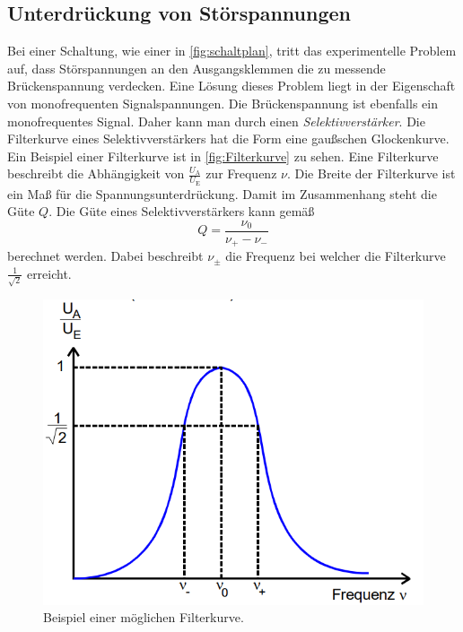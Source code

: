 \subsection{Unterdrückung von Störspannungen}
\label{subsec:unterdrückung}
Bei einer Schaltung, wie einer in \autoref{fig:schaltplan}, tritt das experimentelle Problem auf, dass Störspannungen an den Ausgangsklemmen die zu messende Brückenspannung
verdecken. Eine Lösung dieses Problem liegt in der Eigenschaft von monofrequenten Signalspannungen. Die Brückenspannung ist ebenfalls ein monofrequentes Signal. Daher kann man
durch einen \textit{Selektivverstärker}. Die Filterkurve eines Selektivverstärkers hat die Form eine gaußschen Glockenkurve. Ein Beispiel einer Filterkurve ist in \autoref{fig:Filterkurve}
zu sehen. Eine Filterkurve beschreibt die Abhängigkeit von
$\frac{U_{\text{A}}}{U_{\text{E}}}$ zur Frequenz $\nu$. Die Breite der Filterkurve ist ein Maß für die Spannungsunterdrückung. Damit im Zusammenhang steht die Güte $Q$. Die
Güte eines Selektivverstärkers kann gemäß
\begin{equation}
    \label{eqn:Guete}
    Q = \frac{\nu_0}{\nu_+ - \nu_-}
\end{equation}
berechnet werden. Dabei beschreibt $\nu_{\pm}$ die Frequenz bei welcher die Filterkurve $\frac{1}{\sqrt{2}}$ erreicht.

\begin{figure}
    \centering
    \includegraphics[width = .5\textwidth]{content/Filterkurve.PNG}
    \caption{Beispiel einer möglichen Filterkurve. \cite{v606}}
    \label{fig:Filterkurve}
\end{figure} 
